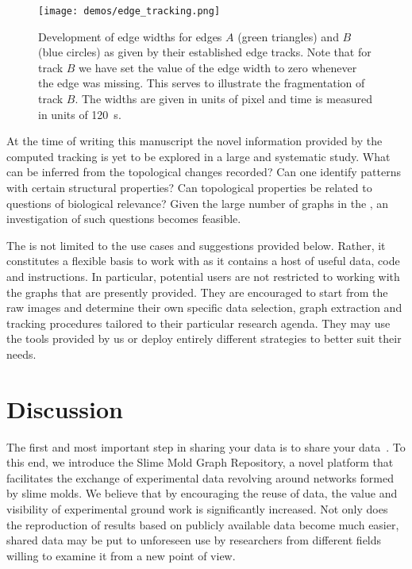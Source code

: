     \begin{figure}
		\centering
		\texttt{[image: demos/edge\_tracking.png]}%
		\caption[Demo - Results for tracking individual edges]{Development of edge widths for edges $A$ (green triangles) and $B$ (blue circles) as given by their established edge tracks. Note that for track $B$ we have set the value of the edge width to zero whenever the edge was missing. This serves to illustrate the fragmentation of track $B$. The widths are given in units of pixel and time is measured in units of \SI{120}{\second}.}
		\label{fig:edge_tracking}%
    \end{figure}


	At the time of writing this manuscript the novel information provided by the computed tracking is yet to be explored in a large and systematic study. What can be inferred from the topological changes recorded? Can one identify patterns with certain structural properties? Can topological properties be related to questions of biological relevance? Given the large number of graphs in the \SMGR, an investigation of such questions becomes feasible.

	The \data is not limited to the use cases and suggestions provided below. Rather, it constitutes a flexible basis to work with as it contains a host of useful data, code and instructions. In particular, potential users are not restricted to working with the graphs that are presently provided. They are encouraged to start from the raw images and determine their own specific data selection, graph extraction and tracking procedures tailored to their particular research agenda. They may use the tools provided by us or deploy entirely different strategies to better suit their needs.

\section{Discussion}

	The first and most important step in sharing your data is to share your data~\cite{white2013nine}. To this end, we introduce the Slime Mold Graph Repository, a novel platform that facilitates the exchange of experimental data revolving around networks formed by slime molds. We believe that by encouraging the reuse of data, the value and visibility of experimental ground work is significantly increased. Not only does the reproduction of results based on publicly available data become much easier, shared data may be put to unforeseen use by researchers from different fields willing to examine it from a new point of view.

